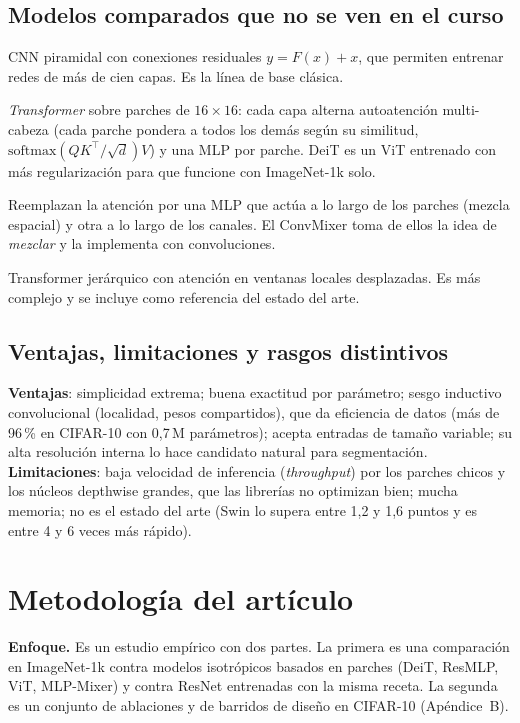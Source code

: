 \documentclass[11pt,a4paper]{article}
\newcommand{\pct}[1]{#1\,\%}
\begin{document}
\subsection{Modelos comparados que no se ven en el curso}
\begin{description}[leftmargin=1em,style=nextline]
  \item[ResNet] \citep{resnet} CNN piramidal con conexiones residuales $y=F(x)+x$, que permiten entrenar redes de
  más de cien capas. Es la línea de base clásica.
  \item[ViT / DeiT] \citep{vit,deit} \emph{Transformer} sobre parches de $16\times16$: cada capa alterna autoatención
  multi-cabeza (cada parche pondera a todos los demás según su similitud,
  $\mathrm{softmax}(QK^\top/\sqrt{d})V$) y una MLP por parche. DeiT es un ViT entrenado con más regularización para
  que funcione con ImageNet-1k solo.
  \item[MLP-Mixer / ResMLP] \citep{mixer,resmlp} Reemplazan la atención por una MLP que actúa a lo largo de los
  parches (mezcla espacial) y otra a lo largo de los canales. El ConvMixer toma de ellos la idea de \emph{mezclar}
  y la implementa con convoluciones.
  \item[Swin] \citep{swin} Transformer jerárquico con atención en ventanas locales desplazadas. Es más complejo y se incluye como
  referencia del estado del arte.
\end{description}

\subsection{Ventajas, limitaciones y rasgos distintivos}
\textbf{Ventajas}: simplicidad extrema; buena exactitud por parámetro; sesgo inductivo convolucional (localidad,
pesos compartidos), que da eficiencia de datos (más de \pct{96} en CIFAR-10 con 0,7\,M parámetros); acepta
entradas de tamaño variable; su alta resolución interna lo hace candidato natural para segmentación.
\textbf{Limitaciones}: baja velocidad de inferencia (\emph{throughput}) por los parches chicos y los núcleos
depthwise grandes, que las librerías no optimizan bien; mucha memoria; no es el estado del arte (Swin lo supera
entre 1,2 y 1,6 puntos y es entre 4 y 6 veces más rápido).

\section{Metodología del artículo}
\textbf{Enfoque.} Es un estudio empírico con dos partes. La primera es una comparación en ImageNet-1k contra
modelos isotrópicos basados en parches (DeiT, ResMLP, ViT, MLP-Mixer) y contra ResNet entrenadas con la misma
receta. La segunda es un conjunto de ablaciones y de barridos de diseño en CIFAR-10 (Apéndice~B).
\end{document}
